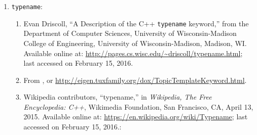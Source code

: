 \begin{enumerate}
\begin{enumerate}
		\begin{enumerate} \itemsep -2pt
		\item 
		\end{enumerate}
	\item : \vspace{-0.2cm}
		\begin{enumerate} \itemsep -2pt
		\item 
		\end{enumerate}
	\item : \vspace{-0.2cm}
		\begin{enumerate} \itemsep -2pt
		\item 
		\end{enumerate}
	\item : \vspace{-0.2cm}
		\begin{enumerate} \itemsep -2pt
		\item 
		\end{enumerate}
	\item : \vspace{-0.2cm}
		\begin{enumerate} \itemsep -2pt
		\item 
		\end{enumerate}
	\end{enumerate}
\item {\tt typename}: \vspace{-0.3cm}
	\begin{enumerate} \itemsep -2pt
	\item Evan Driscoll, ``A Description of the C++ {\tt typename} keyword,'' from the Department of Computer Sciences, University of Wisconsin-Madison College of Engineering, University of Wisconsin-Madison, Madison, WI. Available online at: \url{http://pages.cs.wisc.edu/~driscoll/typename.html}; last accessed on February 15, 2016.
	\item From \cite[API documentation for Eigen3: The template and typename keywords in C++]{Avery2016}, or \url{http://eigen.tuxfamily.org/dox/TopicTemplateKeyword.html}.
	\item Wikipedia contributors, ``typename,'' in {\it Wikipedia, The Free Encyclopedia: C++}, Wikimedia Foundation, San Francisco, CA, April 13, 2015. Available online at: \url{https://en.wikipedia.org/wiki/Typename}; last accessed on February 15, 2016.: \vspace{-0.2cm}
		\begin{enumerate} \itemsep -2pt

\end{enumerate}
\end{enumerate}
\end{enumerate}
